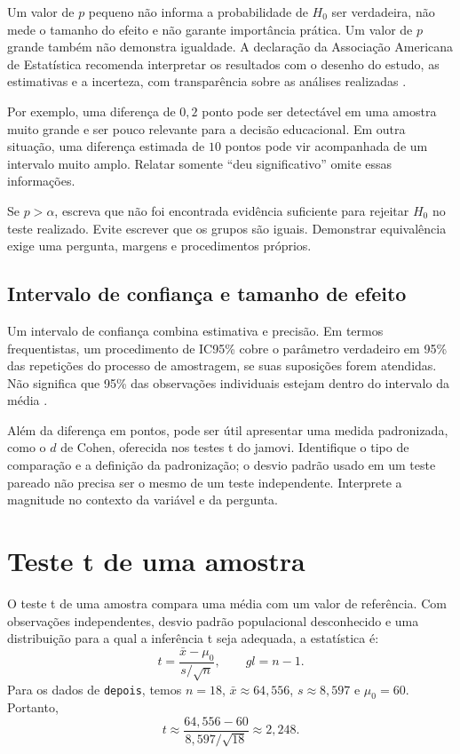 Um valor de $p$ pequeno não informa a probabilidade de $H_0$ ser verdadeira, não mede o tamanho do efeito e não garante importância prática. Um valor de $p$ grande também não demonstra igualdade. A declaração da Associação Americana de Estatística recomenda interpretar os resultados com o desenho do estudo, as estimativas e a incerteza, com transparência sobre as análises realizadas \parencite{WassersteinLazar2016}.

Por exemplo, uma diferença de $0{,}2$ ponto pode ser detectável em uma amostra muito grande e ser pouco relevante para a decisão educacional. Em outra situação, uma diferença estimada de $10$ pontos pode vir acompanhada de um intervalo muito amplo. Relatar somente ``deu significativo'' omite essas informações.

\begin{tcolorbox}[colback=white,colframe=green,title={Dica de Conteúdo}]
Se $p>\alpha$, escreva que não foi encontrada evidência suficiente para rejeitar $H_0$ no teste realizado. Evite escrever que os grupos são iguais. Demonstrar equivalência exige uma pergunta, margens e procedimentos próprios.
\end{tcolorbox}

\subsection{Intervalo de confiança e tamanho de efeito}

Um intervalo de confiança combina estimativa e precisão. Em termos frequentistas, um procedimento de IC95\% cobre o parâmetro verdadeiro em 95\% das repetições do processo de amostragem, se suas suposições forem atendidas. Não significa que 95\% das observações individuais estejam dentro do intervalo da média \parencite{NISTIntervalo}.

Além da diferença em pontos, pode ser útil apresentar uma medida padronizada, como o $d$ de Cohen, oferecida nos testes t do jamovi. Identifique o tipo de comparação e a definição da padronização; o desvio padrão usado em um teste pareado não precisa ser o mesmo de um teste independente. Interprete a magnitude no contexto da variável e da pergunta.

\section{Teste t de uma amostra}

O teste t de uma amostra compara uma média com um valor de referência. Com observações independentes, desvio padrão populacional desconhecido e uma distribuição para a qual a inferência t seja adequada, a estatística é:
\[
t=\frac{\bar{x}-\mu_0}{s/\sqrt{n}},\qquad gl=n-1.
\]
Para os dados de \texttt{depois}, temos $n=18$, $\bar{x}\approx64{,}556$, $s\approx8{,}597$ e $\mu_0=60$. Portanto,
\[
t\approx\frac{64{,}556-60}{8{,}597/\sqrt{18}}\approx2{,}248.
\]

